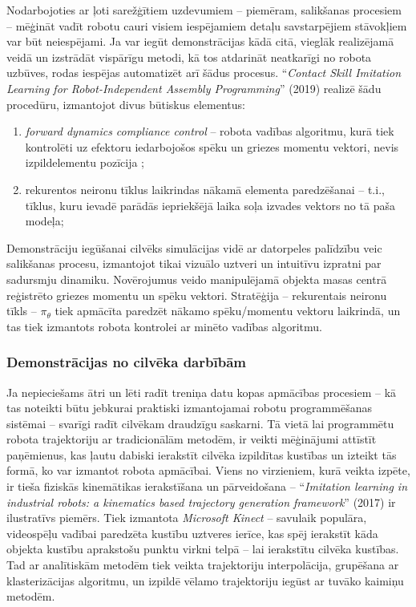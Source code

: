 \documentclass[12pt, a4paper]{article}
\numberwithin{equation}{section} %
\begin{document}
Nodarbojoties ar ļoti sarežģītiem uzdevumiem -- piemēram, salikšanas procesiem -- mēģināt vadīt robotu cauri visiem iespējamiem detaļu savstarpējiem stāvokļiem var būt neiespējami. Ja var iegūt demonstrācijas kādā citā, vieglāk realizējamā veidā un izstrādāt vispārīgu metodi, kā tos atdarināt neatkarīgi no robota uzbūves, rodas iespējas automatizēt arī šādus procesus. ``\textit{Contact Skill Imitation Learning for Robot-Independent Assembly Programming}'' \cite{scherzinger2019contact} (2019) realizē šādu procedūru, izmantojot divus būtiskus elementus:

\begin{enumerate}
    \item \textit{forward dynamics compliance control} -- robota vadības algoritmu, kurā tiek kontrolēti uz efektoru iedarbojošos spēku un griezes momentu vektori, nevis izpildelementu pozīcija \cite{scherzinger2017forward};
    \item rekurentos neironu tīklus laikrindas nākamā elementa paredzēšanai -- t.i., tīklus, kuru ievadē parādās iepriekšējā laika soļa izvades vektors no tā paša modeļa;
\end{enumerate}

Demonstrāciju iegūšanai cilvēks simulācijas vidē ar datorpeles palīdzību veic salikšanas procesu, izmantojot tikai vizuālo uztveri un intuitīvu izpratni par sadursmju dinamiku. Novērojumus veido manipulējamā objekta masas centrā reģistrēto griezes momentu un spēku vektori. Stratēģija -- rekurentais neironu tīkls -- $\pi_{\theta}$ tiek apmācīta paredzēt nākamo spēku/momentu vektoru laikrindā, un tas tiek izmantots robota kontrolei ar minēto vadības algoritmu.

\subsubsection{Demonstrācijas no cilvēka darbībām}

Ja nepieciešams ātri un lēti radīt treniņa datu kopas apmācības procesiem -- kā tas noteikti būtu jebkurai praktiski izmantojamai robotu programmēšanas sistēmai -- svarīgi radīt cilvēkam draudzīgu saskarni. Tā vietā lai programmētu robota trajektoriju ar tradicionālām metodēm, ir veikti mēģinājumi attīstīt paņēmienus, kas ļautu dabiski ierakstīt cilvēka izpildītas kustības un izteikt tās formā, ko var izmantot robota apmācībai. Viens no virzieniem, kurā veikta izpēte, ir tieša fiziskās kinemātikas ierakstīšana un pārveidošana -- ``\textit{Imitation learning in industrial robots: a kinematics based trajectory generation framework}'' \cite{jha2017imitation} (2017) ir ilustratīvs piemērs. Tiek izmantota \textit{Microsoft Kinect} -- savulaik populāra, videospēļu vadībai paredzēta kustību uztveres ierīce, kas spēj ierakstīt kāda objekta kustību aprakstošu punktu virkni telpā -- lai ierakstītu cilvēka kustības. Tad ar analītiskām metodēm tiek veikta trajektoriju interpolācija, grupēšana ar klasterizācijas algoritmu, un izpildē vēlamo trajektoriju iegūst ar tuvāko kaimiņu metodēm.
\end{document}
